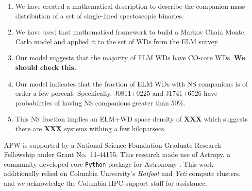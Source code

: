 \documentclass[letterpaper,12pt,preprint]{aastex}
\begin{document}
\begin{enumerate}
\item We have created a mathematical description to describe the companion mass distribution of a set of single-lined spectoscopic binaries. \\
\item We have used that mathematical framework to build a Markov Chain Monte Carlo model and applied it to the set of WDs from the ELM survey. \\
\item Our model suggests that the majority of ELM WDs have CO-core WDs. {\bf We should check this.} \\
\item Our model indicates that the fraction of ELM WDs with NS companions is of order a few percent. Specifically, J0811$+$0225 and J1741$+$6526 have probabilities of having NS companions greater than 50\%. \\
\item This NS fraction implies an ELM+WD space density of {\bf XXX} which suggests there are {\bf XXX} systems withing a few kiloparsecs.
\end{enumerate}

\acknowledgements
APW is supported by a National Science Foundation Graduate Research Fellowship under Grant No.\ 11-44155. 
This research made use of Astropy, a community-developed core \texttt{Python} package for Astronomy \citep{astropy13}.
This work additionally relied on Columbia University's \emph{Hotfoot} and \emph{Yeti} compute clusters, and we acknowledge the Columbia HPC support staff for assistance. \\



\end{document}
